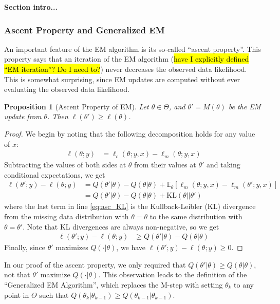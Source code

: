 \documentclass[11pt, oneside]{article}   	%
\newcommand{\bE}{\mathbb{E}}
\newtheorem{proposition}{Proposition}[section]
\begin{document}
\textbf{Section intro...}

\subsubsection{Ascent Property and Generalized EM}
\label{sec:GEM}

An important feature of the EM algorithm is its so-called ``ascent property''. This property says that an iteration of the EM algorithm (\hl{have I explicitly defined ``EM iteration''? Do I need to?}) never decreases the observed data likelihood. This is somewhat surprising, since EM updates are computed without ever evaluating the observed data likelihood. 

\begin{proposition}[Ascent Property of EM]
    Let $\theta \in \Theta$, and $\theta' = M(\theta)$ be the EM update from $\theta$. Then $\ell(\theta') \geq \ell(\theta)$.
\end{proposition}

\begin{proof}
    We begin by noting that the following decomposition holds for any value of $x$:
    \begin{align}
        \ell(\theta; y) &= \ell_c(\theta; y, x) - \ell_m(\theta; y, x)
    \end{align}
    Subtracting the values of both sides at $\theta$ from their values at $\theta'$ and taking conditional expectations, we get
    \begin{align}
        \ell(\theta'; y) - \ell(\theta; y) &= Q(\theta'|\theta) - Q(\theta|\theta) + \bE_{\theta}[\ell_m(\theta; y, x) - \ell_m(\theta'; y, x)]\\
        &= Q(\theta'|\theta) - Q(\theta|\theta) + \mathrm{KL}(\theta || \theta') \label{eq:asc_KL}
    \end{align}
    where the last term in line \ref{eq:asc_KL} is the Kullback-Leibler (KL) divergence from the missing data distribution with $\theta = \theta$ to the same distribution with $\theta = \theta'$. Note that KL divergences are always non-negative, so we get
    \begin{align}
    \ell(\theta'; y) - \ell(\theta; y) &\geq Q(\theta'|\theta) - Q(\theta|\theta)    
    \end{align}
    Finally, since $\theta'$ maximizes $Q(\cdot|\theta)$, we have $\ell(\theta'; y) - \ell(\theta; y) \geq 0$.
\end{proof}

In our proof of the ascent property, we only required that $Q(\theta'|\theta) \geq Q(\theta|\theta)$, not that $\theta'$ maximize $Q(\cdot|\theta)$. This observation leads to the definition of the ``Generalized EM Algorithm'', which replaces the M-step with setting $\theta_k$ to any point in $\Theta$ such that $Q(\theta_k|\theta_{k-1}) \geq Q(\theta_{k-1}|\theta_{k-1})$.
\end{document}
